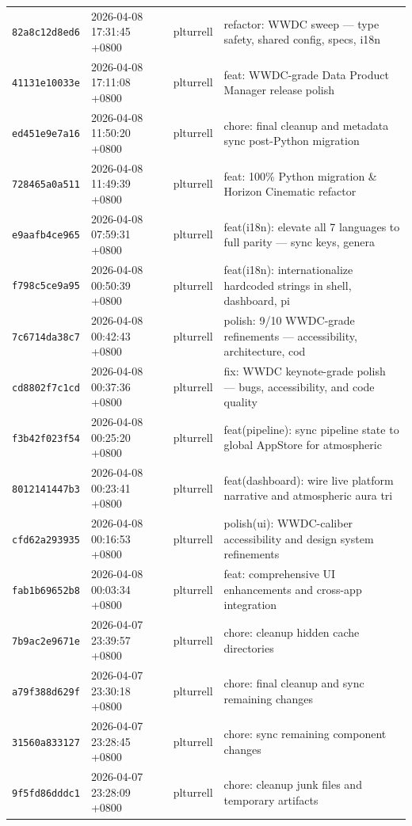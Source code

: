 \documentclass[11pt,a4paper]{article}
\begin{document}
\begin{longtable}{|p{2.2cm}|p{3.2cm}|l|p{6cm}|}
\texttt{82a8c12d8ed6} & 2026-04-08 17:31:45 +0800 & plturrell & refactor: WWDC sweep — type safety, shared config, specs, i18n \\
\texttt{41131e10033e} & 2026-04-08 17:11:08 +0800 & plturrell & feat: WWDC-grade Data Product Manager release polish \\
\texttt{ed451e9e7a16} & 2026-04-08 11:50:20 +0800 & plturrell & chore: final cleanup and metadata sync post-Python migration \\
\texttt{728465a0a511} & 2026-04-08 11:49:39 +0800 & plturrell & feat: 100\% Python migration \& Horizon Cinematic refactor \\
\texttt{e9aafb4ce965} & 2026-04-08 07:59:31 +0800 & plturrell & feat(i18n): elevate all 7 languages to full parity — sync keys, genera \\
\texttt{f798c5ce9a95} & 2026-04-08 00:50:39 +0800 & plturrell & feat(i18n): internationalize hardcoded strings in shell, dashboard, pi \\
\texttt{7c6714da38c7} & 2026-04-08 00:42:43 +0800 & plturrell & polish: 9/10 WWDC-grade refinements — accessibility, architecture, cod \\
\texttt{cd8802f7c1cd} & 2026-04-08 00:37:36 +0800 & plturrell & fix: WWDC keynote-grade polish — bugs, accessibility, and code quality \\
\texttt{f3b42f023f54} & 2026-04-08 00:25:20 +0800 & plturrell & feat(pipeline): sync pipeline state to global AppStore for atmospheric \\
\texttt{8012141447b3} & 2026-04-08 00:23:41 +0800 & plturrell & feat(dashboard): wire live platform narrative and atmospheric aura tri \\
\texttt{cfd62a293935} & 2026-04-08 00:16:53 +0800 & plturrell & polish(ui): WWDC-caliber accessibility and design system refinements \\
\texttt{fab1b69652b8} & 2026-04-08 00:03:34 +0800 & plturrell & feat: comprehensive UI enhancements and cross-app integration \\
\texttt{7b9ac2e9671e} & 2026-04-07 23:39:57 +0800 & plturrell & chore: cleanup hidden cache directories \\
\texttt{a79f388d629f} & 2026-04-07 23:30:18 +0800 & plturrell & chore: final cleanup and sync remaining changes \\
\texttt{31560a833127} & 2026-04-07 23:28:45 +0800 & plturrell & chore: sync remaining component changes \\
\texttt{9f5fd86dddc1} & 2026-04-07 23:28:09 +0800 & plturrell & chore: cleanup junk files and temporary artifacts \\

\end{longtable}
\end{document}
